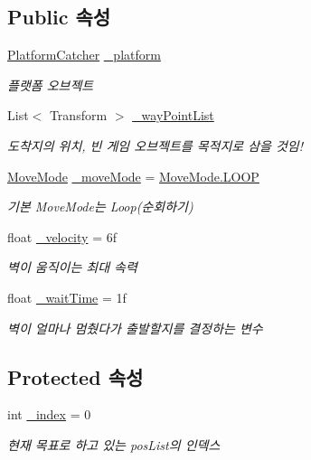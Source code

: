 \subsection*{Public 속성}
\begin{DoxyCompactItemize}
\item 
\mbox{\hyperlink{class_platform_catcher}{Platform\+Catcher}} \mbox{\hyperlink{class_moving_platform_a2269ebd689de9ad6368f64b6b14cecb6}{\+\_\+platform}}
\begin{DoxyCompactList}\small\item\em 플랫폼 오브젝트 \end{DoxyCompactList}\item 
List$<$ Transform $>$ \mbox{\hyperlink{class_moving_platform_a59ac15d3e2b4bff0df981fa4839e5f61}{\+\_\+way\+Point\+List}}
\begin{DoxyCompactList}\small\item\em 도착지의 위치, 빈 게임 오브젝트를 목적지로 삼을 것임! \end{DoxyCompactList}\item 
\mbox{\hyperlink{class_moving_platform_a7b3427d2906069ecf4c39d69eee53653}{Move\+Mode}} \mbox{\hyperlink{class_moving_platform_a47308284bdf720a8fe919a69f2c0019b}{\+\_\+move\+Mode}} = \mbox{\hyperlink{class_moving_platform_a7b3427d2906069ecf4c39d69eee53653a9159b3578e4e1eb31ffdf90acd6f6e40}{Move\+Mode.\+L\+O\+OP}}
\begin{DoxyCompactList}\small\item\em 기본 Move\+Mode는 Loop(순회하기) \end{DoxyCompactList}\item 
float \mbox{\hyperlink{class_moving_platform_a831cd24df75aa37f0897741d189686a7}{\+\_\+velocity}} = 6f
\begin{DoxyCompactList}\small\item\em 벽이 움직이는 최대 속력 \end{DoxyCompactList}\item 
float \mbox{\hyperlink{class_moving_platform_af1a2156a73b89603147dc4009679c738}{\+\_\+wait\+Time}} = 1f
\begin{DoxyCompactList}\small\item\em 벽이 얼마나 멈췄다가 출발할지를 결정하는 변수 \end{DoxyCompactList}\end{DoxyCompactItemize}
\subsection*{Protected 속성}
\begin{DoxyCompactItemize}
\item 
int \mbox{\hyperlink{class_moving_platform_a20948e50a50c338c4e62f84a633868ac}{\+\_\+index}} = 0
\begin{DoxyCompactList}\small\item\em 현재 목표로 하고 있는 pos\+List의 인덱스 \end{DoxyCompactList}\end{DoxyCompactItemize}
